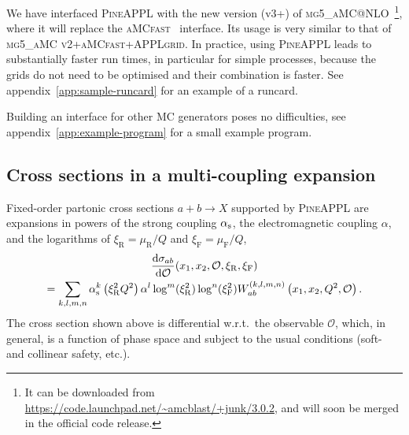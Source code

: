 We have interfaced \textsc{PineAPPL} with the new version (v3+) of \textsc{mg5\_aMC@NLO}~\cite{Alwall:2014hca,Frederix:2018nkq}\footnote{It can be downloaded from \url{https://code.launchpad.net/~amcblast/+junk/3.0.2}, and will soon be merged in the official code release.}, where it will replace the \textsc{aMCfast}~\cite{Bertone:2014zva} interface.
Its usage is very similar to that of \textsc{mg5\_aMC v2}+\textsc{aMCfast}+\textsc{APPLgrid}.
In practice, using \textsc{PineAPPL} leads to substantially faster run times, in particular for simple processes, because the grids do not need to be optimised 
and their combination is faster.
See appendix~\ref{app:sample-runcard} for an example of a runcard.

Building an interface for other MC generators poses no difficulties, see appendix~\ref{app:example-program} for a small example program.

\subsection{Cross sections in a multi-coupling expansion}
\label{sec:multi-coupling-expansion}

Fixed-order partonic cross sections $a + b \to X$ supported by \textsc{PineAPPL} are expansions in powers of the strong coupling $\alpha_\mathrm{s}$, the electromagnetic coupling $\alpha$, and the logarithms of $\xi_\mathrm{R} = \mu_\mathrm{R} / Q$ and $\xi_\mathrm{F} = \mu_\mathrm{F} / Q$,
\begin{multline}
\frac{\mathrm{d} \sigma_{ab}}{\mathrm{d} \mathcal{O}} (x_1, x_2, \mathcal{O}, \xi_\mathrm{R}, \xi_\mathrm{F}) \\
= \sum_{k,l,m,n} \alpha_\mathrm{s}^k \left( \xi_\mathrm{R}^2 Q^2 \right) \alpha^l \log^m ( \xi_\mathrm{R}^2 ) \log^n ( \xi_\mathrm{F}^2 ) W_{ab}^{(k,l,m,n)} \left( x_1, x_2, Q^2, \mathcal{O} \right) \text{.}
\label{eq:expansion}
\end{multline}
The cross section shown above is differential w.r.t.\ the observable $\mathcal{O}$, which, in general, is a function of phase space and subject to the usual conditions (soft- and collinear safety, etc.).

